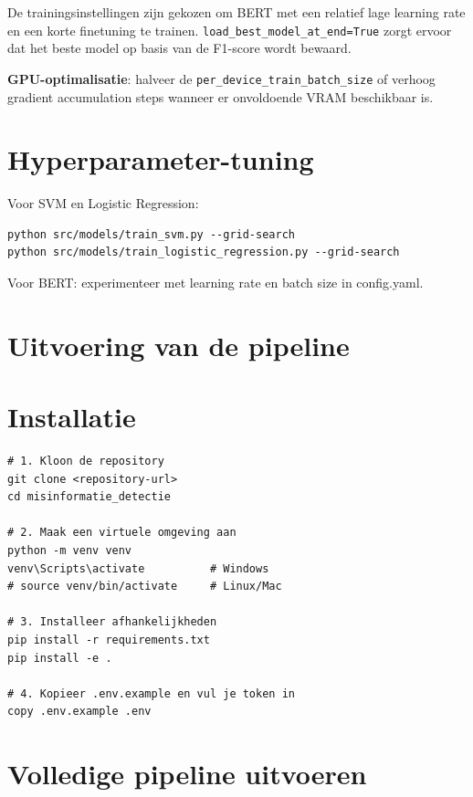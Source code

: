 De trainingsinstellingen zijn gekozen om BERT met een relatief lage
learning rate en een korte finetuning te trainen. \texttt{load\_best\_model\_at\_end=True}
zorgt ervoor dat het beste model op basis van de F1-score wordt bewaard.

\textbf{GPU-optimalisatie}: halveer de
\texttt{per\_device\_train\_batch\_size} of verhoog gradient accumulation
steps wanneer er onvoldoende VRAM beschikbaar is.

\section{Hyperparameter-tuning}

Voor SVM en Logistic Regression:

\begin{verbatim}
python src/models/train_svm.py --grid-search
python src/models/train_logistic_regression.py --grid-search
\end{verbatim}

Voor BERT: experimenteer met learning rate en batch size in config.yaml.

\section{Uitvoering van de pipeline}\label{sec:uitvoering}

\section{Installatie}

\begin{verbatim}
# 1. Kloon de repository
git clone <repository-url>
cd misinformatie_detectie

# 2. Maak een virtuele omgeving aan
python -m venv venv
venv\Scripts\activate          # Windows
# source venv/bin/activate     # Linux/Mac

# 3. Installeer afhankelijkheden
pip install -r requirements.txt
pip install -e .

# 4. Kopieer .env.example en vul je token in
copy .env.example .env
\end{verbatim}

\section{Volledige pipeline uitvoeren}

